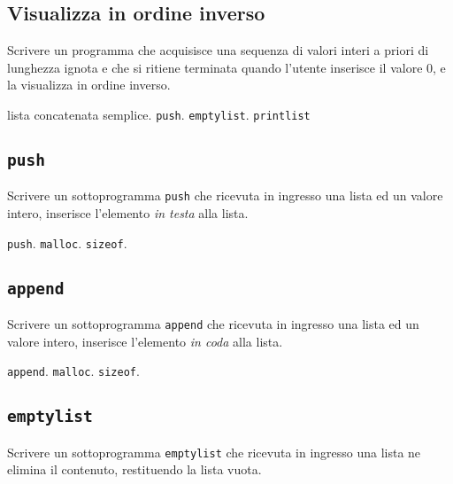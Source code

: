 \subsection{Visualizza in ordine inverso}
Scrivere un programma che acquisisce una sequenza di valori interi a priori di lunghezza ignota e che si ritiene terminata quando l'utente inserisce il valore 0, e la visualizza in ordine inverso.

\begin{tags}
lista concatenata semplice. \texttt{push}. \texttt{emptylist}. \texttt{printlist}
\end{tags}


\subsection{\texttt{push}}
Scrivere un sottoprogramma \texttt{push} che ricevuta in ingresso una lista ed un valore intero, inserisce l'elemento \textit{in testa} alla lista.


\begin{tags}
\texttt{push}. \texttt{malloc}. \texttt{sizeof}.
\end{tags}


\subsection{\texttt{append}}
Scrivere un sottoprogramma \texttt{append} che ricevuta in ingresso una lista ed un valore intero, inserisce l'elemento \textit{in coda} alla lista.


\begin{tags}
\texttt{append}. \texttt{malloc}. \texttt{sizeof}.
\end{tags}


\subsection{\texttt{emptylist}}
Scrivere un sottoprogramma \texttt{emptylist} che ricevuta in ingresso una lista ne elimina il contenuto, restituendo la lista vuota.

